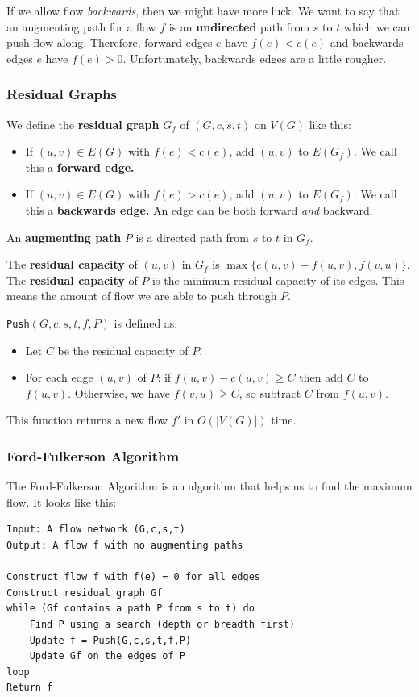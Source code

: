 \documentclass[11pt,a4paper,titlepage,dvipsnames,cmyk]{scrartcl}
\begin{document}
If we allow flow \textit{backwards}, then we might have more luck. We want
to say that an augmenting path for a flow $f$ is an \textbf{undirected}
path from $s$ to $t$ which we can push flow along. Therefore, forward
edges $e$ have $f(e) < c(e)$ and backwards edges $e$ have $f(e) > 0$.
Unfortunately, backwards edges are a little rougher.

\subsubsection{Residual Graphs}%
\label{ssub:residual-graphs}
We define the \textbf{residual graph} $G_f$ of $(G,c,s,t)$ on $V(G)$ like
this:
\begin{itemize}
    \item If $(u,v) \in E(G)$ with $f(e) < c(e)$, add $(u,v)$ to $E(G_f)$.
        We call this a \textbf{forward edge.}
    \item If $(u,v) \in E(G)$ with $f(e) > c(e)$, add $(u,v)$ to $E(G_f)$.
        We call this a \textbf{backwards edge.} An edge can be both
        forward \textit{and} backward.
\end{itemize}

An \textbf{augmenting path} $P$ is a directed path from $s$ to $t$ in
$G_f$.

The \textbf{residual capacity} of $(u,v)$ in $G_f$ is $\max\{c(u,v) -
f(u,v),f(v,u)\}$. The \textbf{residual capacity} of $P$ is the minimum
residual capacity of its edges. This means the amount of flow we are able
to push through $P$.

\texttt{Push}$(G,c,s,t,f,P)$ is defined as:
\begin{itemize}
    \item Let $C$ be the residual capacity of $P$.
    \item For each edge $(u,v)$ of $P$: if $f(u,v) - c(u,v) \ge C$ then
        add $C$ to $f(u,v)$. Otherwise, we have $f(v,u) \ge C$, so
        subtract $C$ from $f(u,v)$.
\end{itemize}

This function returns a new flow $f'$ in $O(|V(G)|)$ time.

\subsubsection{Ford-Fulkerson Algorithm}%
\label{ssub:ford-fulkerson}
The Ford-Fulkerson Algorithm is an algorithm that helps us to find the
maximum flow. It looks like this:
\begin{lstlisting}
Input: A flow network (G,c,s,t)
Output: A flow f with no augmenting paths

Construct flow f with f(e) = 0 for all edges
Construct residual graph Gf
while (Gf contains a path P from s to t) do
    Find P using a search (depth or breadth first)
    Update f = Push(G,c,s,t,f,P)
    Update Gf on the edges of P
loop
Return f
\end{lstlisting}
\end{document}
